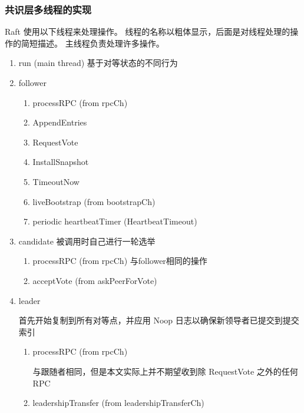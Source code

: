 		\subsubsection{共识层多线程的实现}
		Raft 使用以下线程来处理操作。 线程的名称以粗体显示，后面是对线程处理的操作的简短描述。 主线程负责处理许多操作。
			\begin{enumerate}
				\item run (main thread)
				基于对等状态的不同行为
					
					\item follower
					\begin{enumerate}
					\item processRPC (from rpcCh)

						
					\item AppendEntries
							
					\item RequestVote
							
					\item InstallSnapshot
							
					\item TimeoutNow
						

					\item liveBootstrap (from bootstrapCh)
					\item periodic heartbeatTimer (HeartbeatTimeout)
					\end{enumerate}
					\item candidate
						被调用时自己进行一轮选举
					
					\begin{enumerate}
					
						\item processRPC (from rpcCh)
							与follower相同的操作

						\item acceptVote (from askPeerForVote)
					
					\end{enumerate}
					
					\item leader 
						
					首先开始复制到所有对等点，并应用 Noop 日志以确保新领导者已提交到提交索引
						\begin{enumerate}
						\item processRPC (from rpcCh)	
							
						与跟随者相同，但是本文实际上并不期望收到除 RequestVote 之外的任何 RPC

						\item leadershipTransfer (from leadershipTransferCh) 
						

\end{enumerate}
\end{enumerate}
